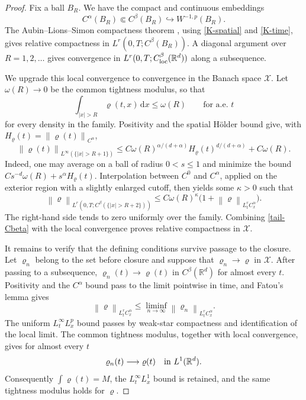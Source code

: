 \documentclass[11pt]{article}
\newcommand{\R}{\mathbb R}
\newcommand{\norm}[1]{\left\lVert #1\right\rVert}
\newcommand{\abs}[1]{\left\lvert #1\right\rvert}
\newcommand{\dd}{\,\mathrm d}
\begin{document}
\begin{proof}
Fix a ball $B_R$.  We have the compact and continuous embeddings
\begin{equation*}
 C^\alpha(B_R)\Subset C^\beta(B_R)
 \hookrightarrow W^{-1,p}(B_R).
\end{equation*}
The Aubin--Lions--Simon compactness theorem \cite{Simon}, using
\eqref{K-spatial} and \eqref{K-time}, gives relative compactness in
$L^r(0,T;C^\beta(B_R))$.  A diagonal argument over $R=1,2,\ldots$ gives
convergence in $L^r(0,T;C^\beta_{\rm loc}(\R^d))$ along a subsequence.

We upgrade this local convergence to convergence in the Banach space
$\mathcal X$.  Let $\omega(R)\to0$ be the common tightness modulus, so that
\begin{equation*}
 \int_{\abs x>R}\varrho(t,x)\dd x\leq\omega(R)
 \qquad\text{for a.e. }t
\end{equation*}
for every density in the family.  Positivity and the spatial H\"older bound
give, with $H_\varrho(t)=\norm{\varrho(t)}_{C^\alpha}$,
\begin{equation}\label{tail-Linfty-holder}
 \norm{\varrho(t)}_{L^\infty(\{\abs x>R+1\})}
 \leq C\omega(R)^{\alpha/(d+\alpha)}
       H_\varrho(t)^{d/(d+\alpha)}+C\omega(R).
\end{equation}
Indeed, one may average on a ball of radius $0<s\leq1$ and minimize the
bound $Cs^{-d}\omega(R)+s^\alpha H_\varrho(t)$.  Interpolation between
$C^0$ and $C^\alpha$, applied on the exterior region with a slightly
enlarged cutoff, then yields some $\kappa>0$ such that
\begin{equation}\label{tail-Cbeta}
 \norm{\varrho}_{L^r(0,T;C^\beta(\{\abs x>R+2\}))}
 \leq C\omega(R)^\kappa
       \bigl(1+\norm{\varrho}_{L^r_tC^\alpha_x}\bigr).
\end{equation}
The right-hand side tends to zero uniformly over the family.  Combining
\eqref{tail-Cbeta} with the local convergence proves relative compactness in
$\mathcal X$.

It remains to verify that the defining conditions survive passage to the
closure.  Let $\varrho_n$ belong to the set before closure and suppose that
$\varrho_n\to\varrho$ in $\mathcal X$.  After passing to a subsequence,
$\varrho_n(t)\to\varrho(t)$ in $C^\beta(\R^d)$ for almost every $t$.
Positivity and the $C^\alpha$ bound pass to the limit pointwise in time, and
Fatou's lemma gives
\begin{equation*}
 \norm{\varrho}_{L^r_tC^\alpha_x}
 \leq\liminf_{n\to\infty}
       \norm{\varrho_n}_{L^r_tC^\alpha_x}.
\end{equation*}
The uniform $L^\infty_tL^p_x$ bound passes by weak-star compactness and
identification of the local limit.  The common tightness modulus, together
with local convergence, gives for almost every $t$
\begin{equation*}
 \varrho_n(t)\longrightarrow\varrho(t)\quad\hbox{in }L^1(\R^d).
\end{equation*}
Consequently $\int\varrho(t)=M$, the $L^\infty_tL^1_x$ bound is retained,
and the same tightness modulus holds for $\varrho$.


\end{proof}
\end{document}

